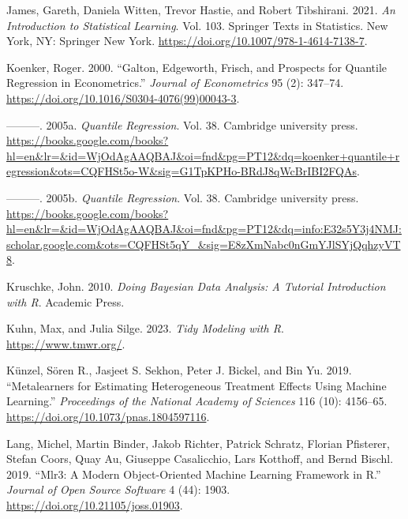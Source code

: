 \documentclass[
  letterpaper,
]{krantz}
\newlength{\cslhangindent}
\newlength{\cslentryspacingunit} %
\newenvironment{CSLReferences}[2] %
 {%
  \setlength{\parindent}{0pt}
  \ifodd #1
  \let\oldpar\par
  \def\par{\hangindent=\cslhangindent\oldpar}
  \fi
  \setlength{\parskip}{#2\cslentryspacingunit}
 }%
 {}
\begin{document}
\begin{CSLReferences}{1}{0}
\leavevmode{}%
James, Gareth, Daniela Witten, Trevor Hastie, and Robert Tibshirani.
2021. \emph{An {Introduction} to {Statistical} {Learning}}. Vol. 103.
Springer {Texts} in {Statistics}. New York, NY: Springer New York.
\url{https://doi.org/10.1007/978-1-4614-7138-7}.

\leavevmode{}%
Koenker, Roger. 2000. {``Galton, {Edgeworth}, {Frisch}, and Prospects
for Quantile Regression in Econometrics.''} \emph{Journal of
Econometrics} 95 (2): 347--74.
\url{https://doi.org/10.1016/S0304-4076(99)00043-3}.

\leavevmode{}%
---------. 2005a. \emph{Quantile Regression}. Vol. 38. Cambridge
university press.
\url{https://books.google.com/books?hl=en&lr=&id=WjOdAgAAQBAJ&oi=fnd&pg=PT12&dq=koenker+quantile+regression&ots=CQFHSt5o-W&sig=G1TpKPHo-BRdJ8qWcBrIBI2FQAs}.

\leavevmode{}%
---------. 2005b. \emph{Quantile Regression}. Vol. 38. Cambridge
university press.
\url{https://books.google.com/books?hl=en&lr=&id=WjOdAgAAQBAJ&oi=fnd&pg=PT12&dq=info:E32s5Y3j4NMJ:scholar.google.com&ots=CQFHSt5qY_&sig=E8zXmNabc0nGmYJlSYjQqhzyVT8}.

\leavevmode{}%
Kruschke, John. 2010. \emph{Doing {Bayesian} {Data} {Analysis}: {A}
{Tutorial} {Introduction} with {R}}. Academic Press.

\leavevmode{}%
Kuhn, Max, and Julia Silge. 2023. \emph{Tidy {Modeling} with {R}}.
\url{https://www.tmwr.org/}.

\leavevmode{}%
Künzel, Sören R., Jasjeet S. Sekhon, Peter J. Bickel, and Bin Yu. 2019.
{``Metalearners for Estimating Heterogeneous Treatment Effects Using
Machine Learning.''} \emph{Proceedings of the National Academy of
Sciences} 116 (10): 4156--65.
\url{https://doi.org/10.1073/pnas.1804597116}.

\leavevmode{}%
Lang, Michel, Martin Binder, Jakob Richter, Patrick Schratz, Florian
Pfisterer, Stefan Coors, Quay Au, Giuseppe Casalicchio, Lars Kotthoff,
and Bernd Bischl. 2019. {``Mlr3: {A} Modern Object-Oriented Machine
Learning Framework in {R}.''} \emph{Journal of Open Source Software} 4
(44): 1903. \url{https://doi.org/10.21105/joss.01903}.


\end{CSLReferences}
\end{document}

